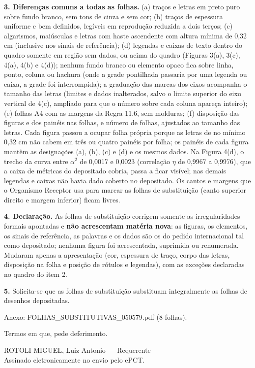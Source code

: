 \documentclass[a4paper,11pt]{article}
\begin{document}
\textbf{3. Diferenças comuns a todas as folhas.} (a) traços e letras em preto puro sobre fundo branco, sem tons de cinza e sem cor; (b) traços de espessura uniforme e bem definidos, legíveis em reprodução reduzida a dois terços; (c) algarismos, maiúsculas e letras com haste ascendente com altura mínima de 0,32 cm (inclusive nos sinais de referência); (d) legendas e caixas de texto dentro do quadro somente em região sem dados, ou acima do quadro (Figuras 3(a), 3(c), 4(a), 4(b) e 4(d)); nenhum fundo branco ou elemento opaco fica sobre linha, ponto, coluna ou hachura (onde a grade pontilhada passaria por uma legenda ou caixa, a grade foi interrompida); a graduação das marcas dos eixos acompanha o tamanho das letras (limites e dados inalterados, salvo o limite superior do eixo vertical de 4(c), ampliado para que o número sobre cada coluna apareça inteiro); (e) folhas A4 com as margens da Regra 11.6, sem molduras; (f) disposição das figuras e dos painéis nas folhas, e número de folhas, ajustados ao tamanho das letras. Cada figura passou a ocupar folha própria porque as letras de no mínimo 0,32 cm não cabem em três ou quatro painéis por folha; os painéis de cada figura mantêm as designações (a), (b), (c) e (d) e os mesmos dados. Na Figura 4(d), o trecho da curva entre $\alpha^2$ de 0,0017 e 0,0023 (correlação $\eta$ de 0,9967 a 0,9976), que a caixa de métricas do depositado cobria, passa a ficar visível; nas demais legendas e caixas não havia dado coberto no depositado. Os cantos e margens que o Organismo Receptor usa para marcar as folhas de substituição (canto superior direito e margem inferior) ficam livres.

\textbf{4. Declaração.} As folhas de substituição corrigem somente as irregularidades formais apontadas e \textbf{não acrescentam matéria nova}: as figuras, os elementos, os sinais de referência, as palavras e os dados são os do pedido internacional tal como depositado; nenhuma figura foi acrescentada, suprimida ou renumerada. Mudaram apenas a apresentação (cor, espessura de traço, corpo das letras, disposição na folha e posição de rótulos e legendas), com as exceções declaradas no quadro do item 2.

\textbf{5.} Solicita-se que as folhas de substituição substituam integralmente as folhas de desenhos depositadas.

Anexo: FOLHAS\_SUBSTITUTIVAS\_050579.pdf (8 folhas).

\begin{minipage}{\linewidth}Termos em que, pede deferimento.

\vspace{1.2cm}ROTOLI MIGUEL, Luiz Antonio --- Requerente\\ Assinado eletronicamente no envio pelo ePCT.\end{minipage}
\end{document}
